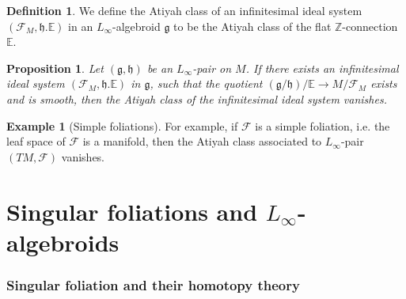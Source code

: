 \documentclass[12pt]{amsart}
\newtheorem{prop}[thm]{Proposition}
\theoremstyle{definition}
\newtheorem{example}[thm]{Example}
\newtheorem{defn}[thm]{Definition}
\theoremstyle{remark}
\numberwithin{equation}{section}
\newcommand{\CF}{{\mathcal F}}
\newcommand{\Z}{{\mathbb{Z}}}
\newcommand{\1}{{\mathbb{1}}}
\newcommand{\g}{\mathfrak{g}}
\newcommand{\h}{\mathfrak{h}}
\begin{document}

\begin{defn}
We define the Atiyah class of an infinitesimal ideal system $(\CF_M, \h. \mathbb{E})$ in an $L_{\infty}$-algebroid $\g$ to be the Atiyah class of the flat $\Z$-connection $\mathbb{E}$.
\end{defn}
\begin{prop}
Let $(\g, \h)$ be an $L_{\infty}$-pair on $M$. If there exists an infinitesimal ideal system $(\CF_M, \h. \mathbb{E})$ in $\g$, such that the quotient $(\g/\h)/\mathbb{E} \to M/\CF_M$ exists and is smooth, then the Atiyah class of the infinitesimal ideal system
vanishes. 
\end{prop}
\begin{example}[Simple foliations]
    For example, if $\CF$ is a simple foliation, i.e. the leaf space of $\CF$ is a manifold, then the Atiyah class associated to $L_{\infty}$-pair $(TM, \CF)$ vanishes.
\end{example}





\part{Singular foliations and $L_{\infty}$-algebroids}
\section{Singular foliation and their homotopy theory}
\end{document}
